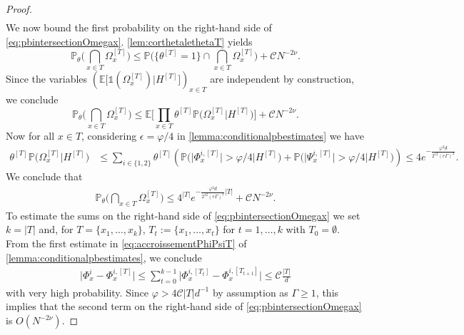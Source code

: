 \documentclass[11pt]{article}
\newcommand{\abs}[1]{\left| #1 \right|}
\newcommand{\absn}[1]{\bigl| #1 \bigr|} %
\theoremstyle{plain}
\theoremstyle{remark}
\numberwithin{equation}{section}
\newcommand*\bset[1]{[#1]}
\begin{document}
\begin{proof}
\begin{equation}
\begin{aligned}
			\end{aligned}
		\end{equation}
		We now bound the first probability on the right-hand side of \cref{eq:pbintersectionOmegax}. 
		\cref{lem:corthetalethetaT} yields 
		\begin{equation*}
			\mathbb{P}_{\theta}\big( \bigcap_{x \in T} \Omega_x^{\bset{T}} \big) \le \mathbb{P}\big( \{ \theta^{\bset{T}} = 1 \} \cap  \bigcap_{x \in T} \Omega_x^{\bset{T}}\big) + \mathcal{C}N^{-2\nu}.
		\end{equation*}
		Since the variables $(\mathbb{E}\big[ \mathds{1} ( \Omega_{x}^{\bset{T}} ) \big| H^{\bset{T}}\big])_{x \in T}$ are independent by construction, we conclude
		\begin{equation*}
			\mathbb{P}_{\theta}\big( \bigcap_{x \in T} \Omega_x^{\bset{T}} \big) \le \mathbb{E}\big[ \prod_{x \in T} \theta^{\bset{T}} \mathbb{P} \big( \Omega_{x}^{\bset{T}}\big| H^{\bset{T}}\big)\big] + \mathcal{C}N^{-2\nu}.
		\end{equation*}
		Now for all $x \in T$, considering $\epsilon = \varphi/4$ in \cref{lemma:conditionalpbestimates} we have
		\begin{align*}
			\theta^{\bset{T}} \mathbb{P} \big( \Omega_{x}^{\bset{T}} \big| H^{\bset{T}}\big) &\le \sum_{i \in \{1,2\}}\theta^{\bset{T}} \left( \mathbb{P} \big(  \absn{\Phi^{i,\bset{T}}_x} > \varphi/4 \big| H^{\bset{T}} \big)+ \mathbb{P} \big(  \absn{\Psi^{i,\bset{T}}_x} > \varphi/4\big| H^{\bset{T}}  \big) \right) \le 4  e^{-\frac{\varphi^2d}{2^{12} (e\Gamma)^2}}. 
		\end{align*}
	 We conclude that
		\begin{align*}
			\mathbb{P}_{\theta}\big( \bigcap_{x \in T} \Omega_x^{\bset{T}} \big) \le 4^{|T|} e^{-\frac{\varphi^2d}{2^{12} (e\Gamma)^2}|T|} + \mathcal{C}N^{-2\nu} .
		\end{align*}
		To estimate the sums on the right-hand side of \cref{eq:pbintersectionOmegax} we set $k= \abs{T}$ and, for $T= \{ x_1,\ldots,x_k\}$, $T_{t}:= \{ x_1,\ldots,x_t\}$ for $t =1, \ldots, k$ with $T_0 = \emptyset$. From the first estimate in \cref{eq:accroissementPhiPsiT} of \cref{lemma:conditionalpbestimates}, we conclude 
		\begin{align*}
			\bigl|\Phi_{x}^{i} - \Phi_{x}^{i,\bset{T}}\bigr| \le \sum_{t=0}^{k-1} \bigl| \Phi_{x}^{i, \bset{T_{t}}} - \Phi_{x}^{i,\bset{T_{t+1}}}\bigr| \le  \mathcal C \frac{\abs{T}}{d}
		\end{align*}
		with very high probability. Since $\varphi> 4 \mathcal C \abs{T}d^{-1}$ by assumption as $\Gamma \geq 1$, this implies that the second term on the right-hand side of \cref{eq:pbintersectionOmegax} is $O(N^{-2\nu})$.
		

\end{proof}
\end{document}
